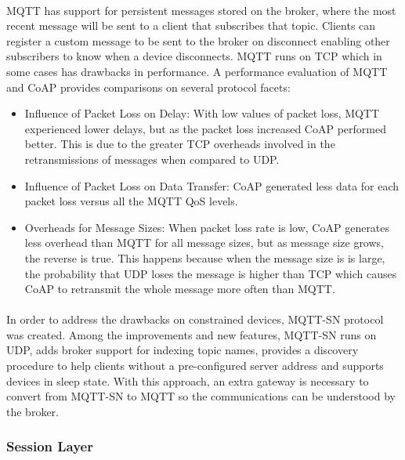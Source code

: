 \paragraph{}
\ac{MQTT} has support for persistent messages stored on the broker, where the most recent message will be sent to a client that subscribes that topic. Clients can register a custom message to be sent to the broker on disconnect enabling other subscribers to know when a device disconnects. \ac{MQTT} runs on \ac{TCP} which in some cases has drawbacks in performance. A performance evaluation of \ac{MQTT} and \ac{CoAP} \cite{Ma2014} provides comparisons on several protocol facets:

\begin{itemize}
	\item Influence of Packet Loss on Delay: With low values of packet loss, \ac{MQTT} experienced lower delays, but as the packet loss increased \ac{CoAP} performed better. This is due to the greater \ac{TCP} overheads involved in the retransmissions of messages when compared to \ac{UDP}.\\
	\item Influence of Packet Loss on Data Transfer: \ac{CoAP} generated less data for each packet loss versus all the \ac{MQTT} \ac{QoS} levels.\\
	\item Overheads for Message Sizes: When packet loss rate is low, \ac{CoAP} generates less overhead than \ac{MQTT} for all message sizes, but as message size grows, the reverse is true. This happens because when the message size is is large, the probability that \ac{UDP} loses the message is higher than \ac{TCP} which causes \ac{CoAP} to retransmit the whole message more often than \ac{MQTT}.
\end{itemize}

\paragraph{}
	In order to address the drawbacks on constrained devices, \ac{MQTT-SN} protocol\cite{Ibm2013} was created. Among the improvements and new features, \ac{MQTT-SN} runs on UDP, adds broker support for indexing topic names, provides a discovery procedure to help clients without a pre-configured server address and supports devices in sleep state. With this approach, an extra gateway is necessary to convert from \ac{MQTT-SN} to \ac{MQTT} so the communications can be understood by the broker.

\subsubsection{Session Layer}

